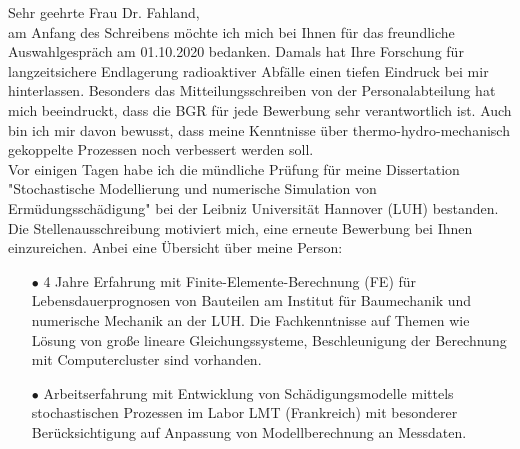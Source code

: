 \begin{adjustwidth}{0cm}{2cm}
	Sehr geehrte Frau Dr. Fahland,\\[1em]
	 am Anfang des Schreibens möchte ich mich bei Ihnen  für das freundliche Auswahlgespräch am 01.10.2020 bedanken. Damals hat Ihre Forschung für langzeitsichere Endlagerung radioaktiver Abfälle einen tiefen Eindruck bei mir hinterlassen. Besonders  das Mitteilungsschreiben von der Personalabteilung hat mich beeindruckt, dass die BGR für jede Bewerbung sehr verantwortlich ist. Auch bin ich mir davon bewusst, dass meine Kenntnisse über thermo-hydro-mechanisch gekoppelte Prozessen noch verbessert werden soll.\\[1em]
	  Vor einigen Tagen habe ich die mündliche Prüfung für meine Dissertation "Stochastische Modellierung und numerische Simulation von Ermüdungsschädigung" bei der Leibniz Universität Hannover (LUH) bestanden. Die Stellenausschreibung motiviert mich, eine erneute Bewerbung bei Ihnen einzureichen. Anbei eine Übersicht  über meine Person:\\[0em]	
		\begin{adjustwidth}{0.5cm}{0cm}
					\begin{itemize}
				\item[$\bullet$]	4 Jahre Erfahrung mit Finite-Elemente-Berechnung (FE) für Lebensdauerprognosen von Bauteilen am Institut für Baumechanik und numerische Mechanik an der LUH. Die Fachkenntnisse auf Themen wie Lösung von große lineare Gleichungssysteme, Beschleunigung der Berechnung 
				mit Computercluster sind vorhanden.  \\[-0.5em]
					\item[$\bullet$] Arbeitserfahrung mit Entwicklung von Schädigungsmodelle mittels stochastischen Prozessen im Labor LMT (Frankreich) mit besonderer Berücksichtigung auf 
					Anpassung von Modellberechnung an Messdaten. \\[-0.5em]
					

\end{itemize}
\end{adjustwidth}
\end{adjustwidth}
